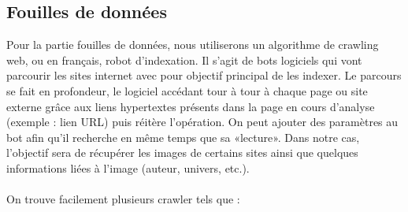 \documentclass[a4paper,12pt]{article}
\begin{document}
\subsection{Fouilles de données}
Pour la partie fouilles de données, nous utiliserons un algorithme de crawling web, ou en français, robot d'indexation.
Il s’agit de bots logiciels qui vont parcourir les sites internet avec
pour objectif principal de les indexer. Le parcours se fait en profondeur, le
logiciel accédant tour à tour à chaque page ou site externe grâce aux liens
hypertextes présents dans la page en cours d’analyse (exemple : lien URL) puis
réitère l’opération. On peut ajouter des paramètres au bot afin qu’il recherche
en même temps que sa «lecture». Dans notre cas, l'objectif sera de récupérer les images de certains sites ainsi que quelques informations liées à l'image (auteur, univers, etc.). \\  \\ 
On trouve facilement plusieurs crawler tels que :
\end{document}
